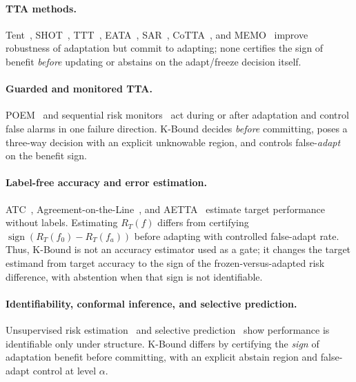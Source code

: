 \documentclass[11pt]{article}
\theoremstyle{plain}
\theoremstyle{definition}
\theoremstyle{remark}
\newcommand{\sign}{\operatorname{sign}}
\begin{document}
\paragraph{TTA methods.}
Tent~\cite{wang2021tent}, SHOT~\cite{liang2020shot}, TTT~\cite{sun2020ttt}, EATA~\cite{niu2022eata},
SAR~\cite{niu2023sar}, CoTTA~\cite{wang2022cotta}, and MEMO~\cite{zhang2022memo} improve
robustness of adaptation but commit to adapting; none certifies the sign of benefit
\emph{before} updating or abstains on the adapt/freeze decision itself.

\paragraph{Guarded and monitored TTA.}
POEM~\cite{bar2024poem} and sequential risk monitors~\cite{schirmer2025monitoring,podkopaev2022tracking}
act during or after adaptation and control false alarms in one failure direction.
K-Bound decides \emph{before} committing, poses a three-way decision with an explicit
unknowable region, and controls false-\emph{adapt} on the benefit sign.

\paragraph{Label-free accuracy and error estimation.}
ATC~\cite{garg2022atc}, Agreement-on-the-Line~\cite{baek2022aol,miller2021aol}, and
AETTA~\cite{lee2024aetta} estimate target performance without labels. Estimating
$R_T(f)$ differs from certifying $\sign(R_T(f_0)-R_T(f_a))$ before adapting with
controlled false-adapt rate. Thus, K-Bound is not an accuracy estimator used as a gate; it
changes the target estimand from target accuracy to the sign of the frozen-versus-adapted
risk difference, with abstention when that sign is not identifiable.

\paragraph{Identifiability, conformal inference, and selective prediction.}
Unsupervised risk estimation~\cite{steinhardt2016,bendavid2010theory,rosenfeld2023dis2}
and selective prediction~\cite{geifman2017selective} show performance is identifiable
only under structure. K-Bound differs by certifying the \emph{sign} of adaptation benefit
before committing, with an explicit abstain region and false-adapt control at level $\alpha$.
\end{document}
